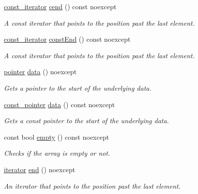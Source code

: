 \begin{DoxyCompactItemize}
\hyperlink{classprism_1_1_array_a187e11a8ec836c0b69b96b51fba73164}{const\+\_\+iterator} \hyperlink{classprism_1_1_array_a28c8781299a9679ebfb5a22e0730ff5f}{cend} () const  noexcept
\begin{DoxyCompactList}\small\item\em A const iterator that points to the position past the last element. \end{DoxyCompactList}\item 
\hyperlink{classprism_1_1_array_a187e11a8ec836c0b69b96b51fba73164}{const\+\_\+iterator} \hyperlink{classprism_1_1_array_ab4c5da3794114938f06ae3a91b88356c}{const\+End} () const  noexcept
\begin{DoxyCompactList}\small\item\em A const iterator that points to the position past the last element. \end{DoxyCompactList}\item 
\hyperlink{classprism_1_1_array_a06cca3e8ac92f77d0068246d715bb0e4}{pointer} \hyperlink{classprism_1_1_array_a8e7f28deb0ba83598ca9a8272bcc054f}{data} () noexcept
\begin{DoxyCompactList}\small\item\em Gets a pointer to the start of the underlying data. \end{DoxyCompactList}\item 
\hyperlink{classprism_1_1_array_a5aa9af8079a0a39654775076cc9d16e2}{const\+\_\+pointer} \hyperlink{classprism_1_1_array_afdd1a8d0150395cf1b4d6c772ba18b4d}{data} () const  noexcept
\begin{DoxyCompactList}\small\item\em Gets a const pointer to the start of the underlying data. \end{DoxyCompactList}\item 
const bool \hyperlink{classprism_1_1_array_aa15d1e6c2dd28c472d09f6d3ba13651c}{empty} () const  noexcept
\begin{DoxyCompactList}\small\item\em Checks if the array is empty or not. \end{DoxyCompactList}\item 
\hyperlink{classprism_1_1_array_a097ed322849188b1c8a8697405160638}{iterator} \hyperlink{classprism_1_1_array_ae9f53b03b9dfbee6d506bcb4c1de8f46}{end} () noexcept
\begin{DoxyCompactList}\small\item\em An iterator that points to the position past the last element. \end{DoxyCompactList}\item 

\end{DoxyCompactItemize}
